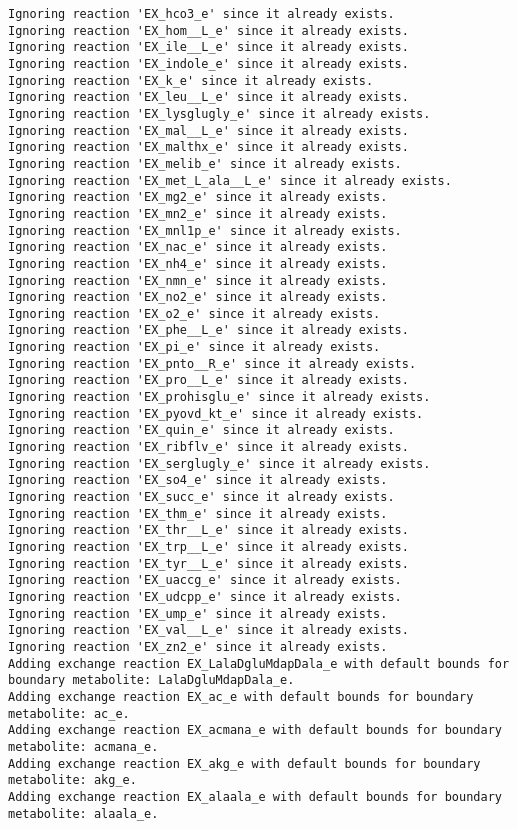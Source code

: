 \documentclass[
  letterpaper,
  DIV=11,
  numbers=noendperiod]{scrartcl}
\begin{document}
\begin{verbatim}
Ignoring reaction 'EX_hco3_e' since it already exists.
Ignoring reaction 'EX_hom__L_e' since it already exists.
Ignoring reaction 'EX_ile__L_e' since it already exists.
Ignoring reaction 'EX_indole_e' since it already exists.
Ignoring reaction 'EX_k_e' since it already exists.
Ignoring reaction 'EX_leu__L_e' since it already exists.
Ignoring reaction 'EX_lysglugly_e' since it already exists.
Ignoring reaction 'EX_mal__L_e' since it already exists.
Ignoring reaction 'EX_malthx_e' since it already exists.
Ignoring reaction 'EX_melib_e' since it already exists.
Ignoring reaction 'EX_met_L_ala__L_e' since it already exists.
Ignoring reaction 'EX_mg2_e' since it already exists.
Ignoring reaction 'EX_mn2_e' since it already exists.
Ignoring reaction 'EX_mnl1p_e' since it already exists.
Ignoring reaction 'EX_nac_e' since it already exists.
Ignoring reaction 'EX_nh4_e' since it already exists.
Ignoring reaction 'EX_nmn_e' since it already exists.
Ignoring reaction 'EX_no2_e' since it already exists.
Ignoring reaction 'EX_o2_e' since it already exists.
Ignoring reaction 'EX_phe__L_e' since it already exists.
Ignoring reaction 'EX_pi_e' since it already exists.
Ignoring reaction 'EX_pnto__R_e' since it already exists.
Ignoring reaction 'EX_pro__L_e' since it already exists.
Ignoring reaction 'EX_prohisglu_e' since it already exists.
Ignoring reaction 'EX_pyovd_kt_e' since it already exists.
Ignoring reaction 'EX_quin_e' since it already exists.
Ignoring reaction 'EX_ribflv_e' since it already exists.
Ignoring reaction 'EX_serglugly_e' since it already exists.
Ignoring reaction 'EX_so4_e' since it already exists.
Ignoring reaction 'EX_succ_e' since it already exists.
Ignoring reaction 'EX_thm_e' since it already exists.
Ignoring reaction 'EX_thr__L_e' since it already exists.
Ignoring reaction 'EX_trp__L_e' since it already exists.
Ignoring reaction 'EX_tyr__L_e' since it already exists.
Ignoring reaction 'EX_uaccg_e' since it already exists.
Ignoring reaction 'EX_udcpp_e' since it already exists.
Ignoring reaction 'EX_ump_e' since it already exists.
Ignoring reaction 'EX_val__L_e' since it already exists.
Ignoring reaction 'EX_zn2_e' since it already exists.
Adding exchange reaction EX_LalaDgluMdapDala_e with default bounds for boundary metabolite: LalaDgluMdapDala_e.
Adding exchange reaction EX_ac_e with default bounds for boundary metabolite: ac_e.
Adding exchange reaction EX_acmana_e with default bounds for boundary metabolite: acmana_e.
Adding exchange reaction EX_akg_e with default bounds for boundary metabolite: akg_e.
Adding exchange reaction EX_alaala_e with default bounds for boundary metabolite: alaala_e.

\end{verbatim}
\end{document}
